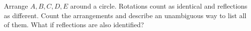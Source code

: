Arrange $A,B,C,D,E$ around a circle. Rotations count as identical and reflections as different. Count the arrangements and describe an unambiguous way to list all of them. What if reflections are also identified?
